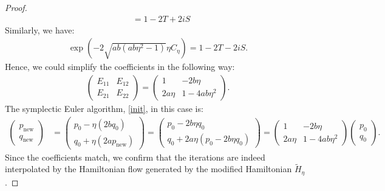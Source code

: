 \documentclass[10pt,a4paper]{amsart}
\begin{document}
\begin{proof}
\begin{align}
    &= 1-2T+2iS \nonumber
\end{align}
Similarly, we have:
\begin{gather}
    \exp\left(-2\sqrt{ab\left(ab\eta^2-1\right)}\eta C_\eta\right) = 1-2T-2iS\nonumber.
\end{gather}
Hence, we could simplify the coefficients in the following way:
\begin{gather}
    \begin{pmatrix}
        E_{11} & E_{12} \\
        E_{21} & E_{22}
    \end{pmatrix}=
    \begin{pmatrix}
        1&-2b\eta \\
        2a\eta &1-4ab\eta^2
    \end{pmatrix}\nonumber.
\end{gather}
The symplectic Euler algorithm, \eqref{init}, in this case is:
\begin{align}
    \begin{pmatrix}
        p_{\text{new}} \\ q_{\text{new}}
    \end{pmatrix}
    &=
    \begin{pmatrix}
        p_0 - \eta (2bq_0) \\
        q_0 + \eta (2ap_{\text{new}})
    \end{pmatrix}=
    \begin{pmatrix}
        p_0 - 2b\eta q_0 \\
        q_0 + 2a \eta \left(p_0 - 2b\eta q_0 \right)
    \end{pmatrix}= 
    \begin{pmatrix}
        1 & - 2b\eta \\
        2a \eta & 1-4ab \eta^2
    \end{pmatrix}
    \begin{pmatrix}
        p_0 \\ q_0
    \end{pmatrix}\nonumber.
\end{align}
Since the coefficients match, we confirm that the iterations are indeed interpolated by the Hamiltonian flow generated by the modified Hamiltonian $\widetilde{H}_{\eta}$.
\end{proof}
\end{document}
